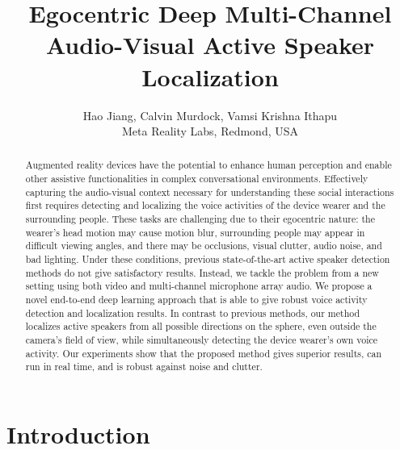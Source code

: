 \documentclass[10pt,twocolumn,letterpaper]{article}
\begin{document}
\title{Egocentric Deep Multi-Channel Audio-Visual Active Speaker Localization}

\author{Hao Jiang, Calvin Murdock, Vamsi Krishna Ithapu\\
Meta Reality Labs, Redmond, USA
}
\maketitle



\begin{abstract}
Augmented reality devices have the potential to enhance human perception 
and enable other assistive functionalities in complex conversational environments.
Effectively capturing the audio-visual context necessary for understanding these
social interactions first requires
detecting and localizing the voice activities of the
device wearer and the surrounding people.
These tasks are challenging due to their egocentric nature: 
the wearer's head motion may cause motion blur,  
surrounding people 
may appear in difficult viewing angles, and there may be occlusions, 
visual clutter, audio noise, and bad lighting.
Under these conditions, previous state-of-the-art 
active speaker detection methods do not give satisfactory results. 
Instead, we tackle the problem from a new setting using both video and multi-channel microphone array audio. 
We propose a novel end-to-end deep learning approach that is able to give robust voice activity detection
and localization results. 
In contrast to previous methods, 
our method localizes active speakers from all possible directions on the sphere, even outside the camera's field of view, 
while simultaneously detecting the device wearer's own voice activity. 
Our experiments show that the proposed method gives superior results, can run in real time, and 
is robust against noise and clutter.

\end{abstract}	



\vspace{-10pt}
\section{Introduction}
\vspace{-5pt}
\end{document}
